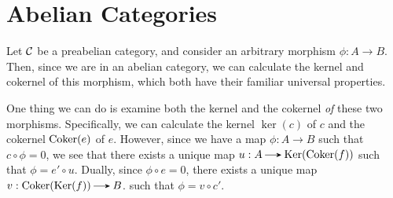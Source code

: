 \newpage
\section{Abelian Categories}

Let $\mathcal{C}$ be a preabelian category, and consider an arbitrary morphism 
$\phi: A \to B$. Then, since we are in an abelian category, we can calculate 
the kernel and cokernel of this morphism, which both have their familiar 
universal properties. 
\begin{center}
\end{center}
One thing we can do is examine both the kernel and the cokernel \emph{of} these two morphisms.
Specifically, we can calculate the kernel $\ker(c)$ of $c$ and the cokernel 
$\operatorname{\mathrm{Coker}}(e)$ of $e$. However, since we have a map $\phi: A \to B$ such that 
$c \circ \phi = 0$, we see that there exists a unique map $u: A \to \ker(\coker(f))$
such that $\phi = e' \circ u$. 
Dually, since $\phi \circ e = 0$, there exists a unique map $v: \coker(\ker(f)) \to B$. 
such that $\phi = v \circ c'$. 
\begin{center}
\end{center}












